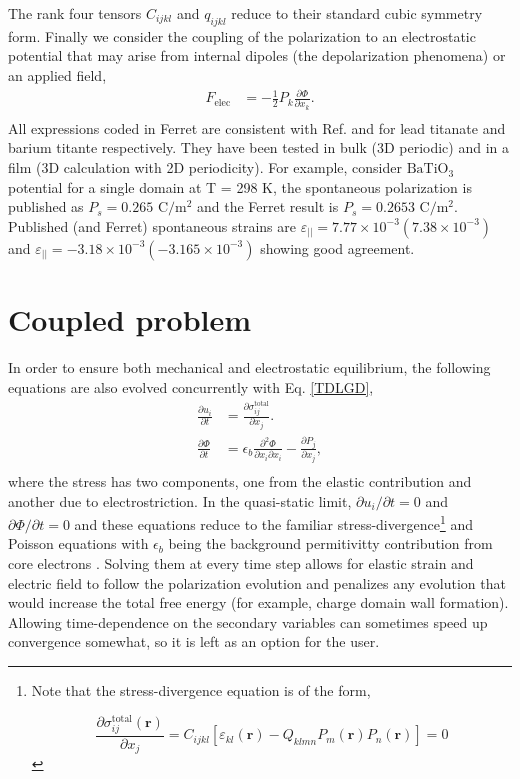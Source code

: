 \documentclass[paper=a4,14pt]{scrartcl} %
\begin{document}
%
The rank four tensors $C_{ijkl}$ and $q_{ijkl}$ reduce to their standard cubic symmetry form. Finally we consider the coupling of the polarization to an electrostatic potential that may arise from internal dipoles (the depolarization phenomena) or an applied field,
%
\begin{align}\label{elastic}
F_\mathrm{elec}&= -\frac{1}{2} P_k \frac{\partial \Phi}{\partial x_k}. \\ \nonumber
\end{align}
%
All expressions coded in Ferret are consistent with Ref. \cite{Li2001} and \cite{Hlinka2006} for lead titanate and barium titante respectively. 
%
They have been tested in bulk (3D periodic) and in a film (3D calculation with 2D periodicity).
%
For example, consider $\mathrm{BaTiO}_3$ potential \cite{Hlinka2006} for a single domain at T = 298 K, the spontaneous polarization is published as $P_s = 0.265$ $\mathrm{C}/\mathrm{m}^2$ and the Ferret result is $P_s = 0.2653$ $\mathrm{C}/\mathrm{m}^2$. Published (and Ferret) spontaneous strains are $\varepsilon_{||} = 7.77\times10^{-3}(7.38\times10^{-3})$ and $\varepsilon_{||} = -3.18\times10^{-3}(-3.165\times10^{-3})$ showing good agreement.
%

\section*{Coupled problem}

In order to ensure both mechanical and electrostatic equilibrium, the following equations are also evolved concurrently with Eq. \ref{TDLGD},
\begin{align}\label{aux}
\frac{\partial u_i}{\partial t}&= \frac{\partial \sigma_{ij}^\mathrm{total}}{\partial x_j}. \\ \nonumber
\frac{\partial \Phi}{\partial t}&= \epsilon_b\frac{\partial^2 \Phi}{\partial x_i \partial x_i}-\frac{\partial P_j}{\partial x_j}, \\ \nonumber
\end{align}
%
where the stress has two components, one from the elastic contribution and another due to electrostriction. In the quasi-static limit, $\partial u_i / \partial t = 0$ and $\partial \Phi / \partial t = 0$ and these equations reduce to the familiar stress-divergence\footnote{Note that the stress-divergence equation is of the form,

$$\frac{\partial \sigma_{ij}^\mathrm{total}(\textbf{r})}{\partial x_j}  = C_{ijkl}\left[\varepsilon_{kl}(\textbf{r}) - Q_{klmn}P_m(\textbf{r}) P_n(\textbf{r})\right] = 0$$} and Poisson equations with $\epsilon_b$ being the background permitivitty contribution from core electrons \cite{Hlinka2006}. 
%
Solving them at every time step allows for elastic strain and electric field to follow the polarization evolution and penalizes any evolution that would increase the total free energy (for example, charge domain wall formation).
%
Allowing time-dependence on the secondary variables can sometimes speed up convergence somewhat, so it is left as an option for the user.
\end{document}

